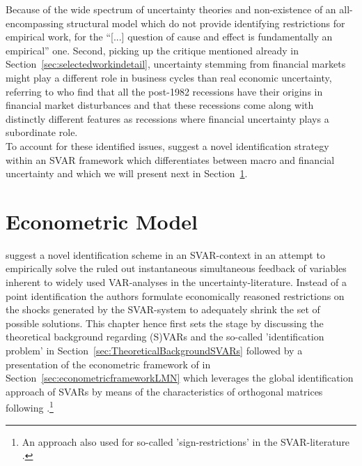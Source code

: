 \documentclass[a4paper,11pt,listof=nochaptergap,oneside,pointednumbers,bibtotoc,bigheadings,liststotoc,hidelinks]{scrbook}
\theoremstyle{mysatz}
\theoremstyle{mydefinition}
\theoremstyle{mytheorem}
\theoremstyle{mybemerkung}
\begin{document}
Because of the wide spectrum of uncertainty theories and non-existence of an all-encompassing structural model which do not provide identifying restrictions for empirical work, for \citet[p. 5]{ludvigsonetal:19} the ``[...] question of cause and effect is fundamentally an empirical'' one. Second, picking up the critique mentioned already in Section~\ref{sec:selectedworkindetail}, uncertainty stemming from financial markets might play a different role in business cycles than real economic uncertainty, referring to \citet{ngandwright:13} who find that all the post-1982 recessions have their origins in financial market disturbances and that these recessions come along with distinctly different features as recessions where financial uncertainty plays a subordinate role.\\

To account for these identified issues, \citet{ludvigsonetal:19} suggest a novel identification strategy within an SVAR framework which differentiates between macro and financial uncertainty and which we will present next in Section~\ref{EconometricModel}.




\chapter{Econometric Model}
\label{EconometricModel}
\citep{ludvigsonetal:18,ludvigsonetal:19} suggest a novel identification scheme in an SVAR-context in an attempt to empirically solve the ruled out instantaneous simultaneous feedback of variables inherent to widely used VAR-analyses in the uncertainty-literature. Instead of a point identification the authors formulate economically reasoned restrictions on the shocks generated by the SVAR-system to adequately shrink the set of possible solutions. This chapter hence first sets the stage by discussing the theoretical background regarding (S)VARs and the so-called 'identification problem' in Section~\ref{sec:TheoreticalBackgroundSVARs} followed by a presentation of the econometric framework of \citet{ludvigsonetal:19} in Section~\ref{sec:econometricframeworkLMN} which leverages the global identification approach of SVARs by means of the characteristics of orthogonal matrices following \citet{rubioetal:10}.\footnote{An approach also used for so-called 'sign-restrictions' in the SVAR-literature \citep{lutkepohlkilian:17}.}
\end{document}
